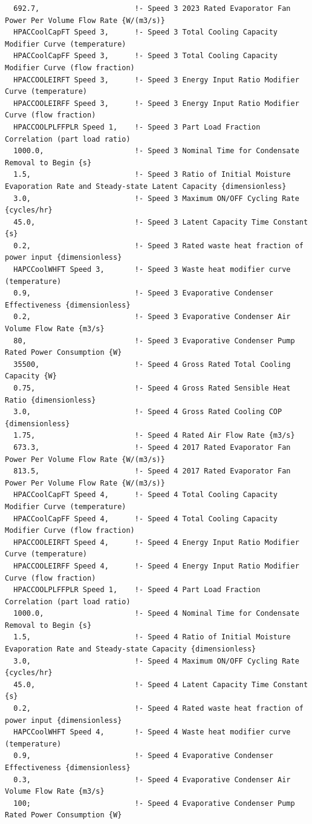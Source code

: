 \begin{lstlisting}
  692.7,                      !- Speed 3 2023 Rated Evaporator Fan Power Per Volume Flow Rate {W/(m3/s)}
  HPACCoolCapFT Speed 3,      !- Speed 3 Total Cooling Capacity Modifier Curve (temperature)
  HPACCoolCapFF Speed 3,      !- Speed 3 Total Cooling Capacity Modifier Curve (flow fraction)
  HPACCOOLEIRFT Speed 3,      !- Speed 3 Energy Input Ratio Modifier Curve (temperature)
  HPACCOOLEIRFF Speed 3,      !- Speed 3 Energy Input Ratio Modifier Curve (flow fraction)
  HPACCOOLPLFFPLR Speed 1,    !- Speed 3 Part Load Fraction Correlation (part load ratio)
  1000.0,                     !- Speed 3 Nominal Time for Condensate Removal to Begin {s}
  1.5,                        !- Speed 3 Ratio of Initial Moisture Evaporation Rate and Steady-state Latent Capacity {dimensionless}
  3.0,                        !- Speed 3 Maximum ON/OFF Cycling Rate {cycles/hr}
  45.0,                       !- Speed 3 Latent Capacity Time Constant {s}
  0.2,                        !- Speed 3 Rated waste heat fraction of power input {dimensionless}
  HAPCCoolWHFT Speed 3,       !- Speed 3 Waste heat modifier curve (temperature)
  0.9,                        !- Speed 3 Evaporative Condenser Effectiveness {dimensionless}
  0.2,                        !- Speed 3 Evaporative Condenser Air Volume Flow Rate {m3/s}
  80,                         !- Speed 3 Evaporative Condenser Pump Rated Power Consumption {W}
  35500,                      !- Speed 4 Gross Rated Total Cooling Capacity {W}
  0.75,                       !- Speed 4 Gross Rated Sensible Heat Ratio {dimensionless}
  3.0,                        !- Speed 4 Gross Rated Cooling COP {dimensionless}
  1.75,                       !- Speed 4 Rated Air Flow Rate {m3/s}
  673.3,                      !- Speed 4 2017 Rated Evaporator Fan Power Per Volume Flow Rate {W/(m3/s)}
  813.5,                      !- Speed 4 2017 Rated Evaporator Fan Power Per Volume Flow Rate {W/(m3/s)}
  HPACCoolCapFT Speed 4,      !- Speed 4 Total Cooling Capacity Modifier Curve (temperature)
  HPACCoolCapFF Speed 4,      !- Speed 4 Total Cooling Capacity Modifier Curve (flow fraction)
  HPACCOOLEIRFT Speed 4,      !- Speed 4 Energy Input Ratio Modifier Curve (temperature)
  HPACCOOLEIRFF Speed 4,      !- Speed 4 Energy Input Ratio Modifier Curve (flow fraction)
  HPACCOOLPLFFPLR Speed 1,    !- Speed 4 Part Load Fraction Correlation (part load ratio)
  1000.0,                     !- Speed 4 Nominal Time for Condensate Removal to Begin {s}
  1.5,                        !- Speed 4 Ratio of Initial Moisture Evaporation Rate and Steady-state Capacity {dimensionless}
  3.0,                        !- Speed 4 Maximum ON/OFF Cycling Rate {cycles/hr}
  45.0,                       !- Speed 4 Latent Capacity Time Constant {s}
  0.2,                        !- Speed 4 Rated waste heat fraction of power input {dimensionless}
  HAPCCoolWHFT Speed 4,       !- Speed 4 Waste heat modifier curve (temperature)
  0.9,                        !- Speed 4 Evaporative Condenser Effectiveness {dimensionless}
  0.3,                        !- Speed 4 Evaporative Condenser Air Volume Flow Rate {m3/s}
  100;                        !- Speed 4 Evaporative Condenser Pump Rated Power Consumption {W}
\end{lstlisting}

